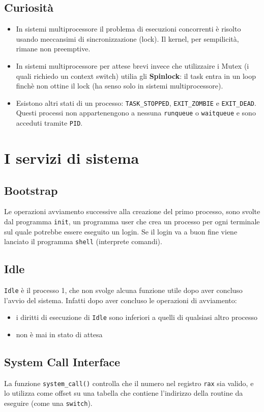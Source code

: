 \documentclass[12pt, a4paper]{report}
\begin{document}
\section{Curiosità}
\begin{itemize}
	\item In sistemi multiprocessore il problema di esecuzioni concorrenti è
		risolto usando meccansimi di sincronizzazione (lock). Il kernel,
		per sempilicità, rimane non preemptive.
	\item In sistemi multiprocessore per attese brevi invece che utilizzaire i
		Mutex (i quali richiedo un context switch) utilia gli
		\textbf{Spinlock}: il task entra in un loop finchè non ottine il lock
		(ha senso solo in sistemi multiprocessore).
	\item Esistono altri stati di un processo: \texttt{TASK\_STOPPED},
		\texttt{EXIT\_ZOMBIE} e \texttt{EXIT\_DEAD}. Questi processi non
		appartenengono a nessuna \texttt{runqueue} o \texttt{waitqueue} e sono
		acceduti tramite \texttt{PID}.
\end{itemize}

\chapter{I servizi di sistema}
\section{Bootstrap}
Le operazioni avviamento successive alla creazione del primo processo, sono
svolte dal programma \texttt{init}, un programma user che crea un processo per
ogni terminale sul quale potrebbe essere eseguito un login. Se  il login va a
buon fine viene lanciato il programma \texttt{shell} (interprete comandi).

\section{Idle}
\texttt{Idle} è il processo 1, che non svolge alcuna funzione utile dopo aver
concluso l'avvio del sistema. Infatti dopo aver concluso le operazioni di
avviamento:
\begin{itemize}
	\item i diritti di esecuzione di \texttt{Idle} sono inferiori a quelli di
		qualsiasi altro processo
	\item non è mai in stato di attesa
\end{itemize}

\section{System Call Interface}
La funzione \texttt{system\_call()} controlla che il numero nel registro
\texttt{rax} sia valido, e lo utilizza come offset su una tabella che contiene
l'indirizzo della routine da eseguire (come una \texttt{switch}).
\end{document}
